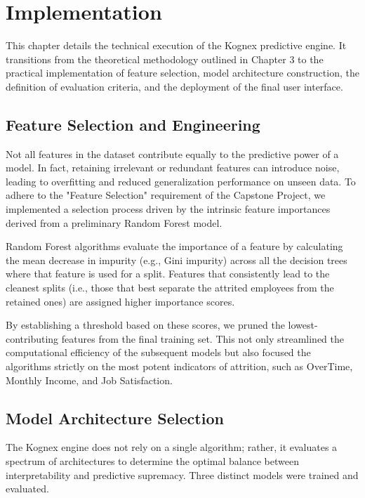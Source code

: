 \chapter{Implementation}

This chapter details the technical execution of the Kognex predictive engine. It transitions from the theoretical methodology outlined in Chapter 3 to the practical implementation of feature selection, model architecture construction, the definition of evaluation criteria, and the deployment of the final user interface.

\section{Feature Selection and Engineering}
Not all features in the dataset contribute equally to the predictive power of a model. In fact, retaining irrelevant or redundant features can introduce noise, leading to overfitting and reduced generalization performance on unseen data. To adhere to the "Feature Selection" requirement of the Capstone Project, we implemented a selection process driven by the intrinsic feature importances derived from a preliminary Random Forest model.

Random Forest algorithms evaluate the importance of a feature by calculating the mean decrease in impurity (e.g., Gini impurity) across all the decision trees where that feature is used for a split. Features that consistently lead to the cleanest splits (i.e., those that best separate the attrited employees from the retained ones) are assigned higher importance scores.

By establishing a threshold based on these scores, we pruned the lowest-contributing features from the final training set. This not only streamlined the computational efficiency of the subsequent models but also focused the algorithms strictly on the most potent indicators of attrition, such as OverTime, Monthly Income, and Job Satisfaction.

\section{Model Architecture Selection}
The Kognex engine does not rely on a single algorithm; rather, it evaluates a spectrum of architectures to determine the optimal balance between interpretability and predictive supremacy. Three distinct models were trained and evaluated.

